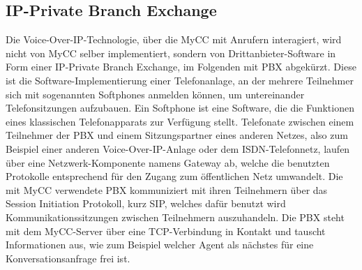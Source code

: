 \subsection{IP-Private Branch Exchange}
\label{subsec:IP-Private Branch Exchange}
Die Voice-Over-IP-Technologie, über die MyCC mit Anrufern interagiert, wird nicht von MyCC selber implementiert, sondern von Drittanbieter-Software in Form einer IP-Private Branch Exchange, im Folgenden mit PBX abgekürzt. Diese ist die Software-Implementierung einer Telefonanlage, an der mehrere Teilnehmer sich mit sogenannten Softphones anmelden können, um untereinander Telefonsitzungen aufzubauen. Ein Softphone ist eine Software, die die Funktionen eines klassischen Telefonapparats zur Verfügung stellt. Telefonate zwischen einem Teilnehmer der PBX und einem Sitzungspartner eines anderen Netzes, also zum Beispiel einer anderen Voice-Over-IP-Anlage oder dem ISDN-Telefonnetz, laufen über eine Netzwerk-Komponente namens Gateway ab, welche die benutzten Protokolle entsprechend für den Zugang zum öffentlichen Netz umwandelt. Die mit MyCC verwendete PBX kommuniziert mit ihren Teilnehmern über das Session Initiation Protokoll, kurz SIP, welches dafür benutzt wird Kommunikationssitzungen zwischen Teilnehmern auszuhandeln. Die PBX steht mit dem MyCC-Server über eine TCP-Verbindung in Kontakt und tauscht Informationen aus, wie zum Beispiel welcher Agent als nächstes für eine Konversationsanfrage frei ist. 

